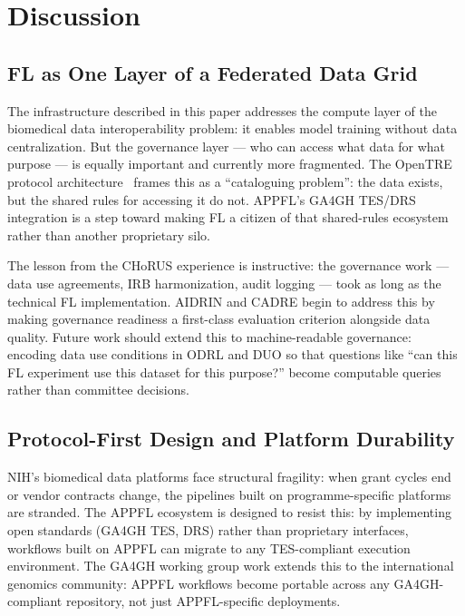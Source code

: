 \documentclass[conference]{IEEEtran}
\begin{document}
\section{Discussion}

\subsection{FL as One Layer of a Federated Data Grid}

The infrastructure described in this paper addresses the compute layer of the biomedical data interoperability problem: it enables model training without data centralization. But the governance layer — who can access what data for what purpose — is equally important and currently more fragmented. The OpenTRE protocol architecture~\cite{varma2026catalogue} frames this as a ``cataloguing problem'': the data exists, but the shared rules for accessing it do not. APPFL's GA4GH TES/DRS integration is a step toward making FL a citizen of that shared-rules ecosystem rather than another proprietary silo.

The lesson from the CHoRUS experience is instructive: the governance work — data use agreements, IRB harmonization, audit logging — took as long as the technical FL implementation. AIDRIN and CADRE begin to address this by making governance readiness a first-class evaluation criterion alongside data quality. Future work should extend this to machine-readable governance: encoding data use conditions in ODRL and DUO so that questions like ``can this FL experiment use this dataset for this purpose?'' become computable queries rather than committee decisions.

\subsection{Protocol-First Design and Platform Durability}

NIH's biomedical data platforms face structural fragility: when grant cycles end or vendor contracts change, the pipelines built on programme-specific platforms are stranded. The APPFL ecosystem is designed to resist this: by implementing open standards (GA4GH TES, DRS) rather than proprietary interfaces, workflows built on APPFL can migrate to any TES-compliant execution environment. The GA4GH working group work extends this to the international genomics community: APPFL workflows become portable across any GA4GH-compliant repository, not just APPFL-specific deployments.
\end{document}
